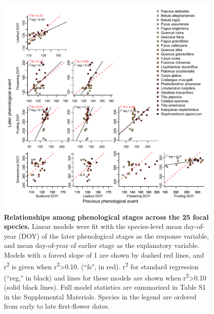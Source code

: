 \documentclass{article}
\begin{document}
 \begin{figure}[h]
 \centering
 \includegraphics{../analyses/figures/Hyp1_forcedslope_samerange.pdf}
 \caption{\textbf{Relationships among phenological stages across the 25 focal species.} Linear models were fit with the species-level mean day-of-year (DOY) of the later phenological stages as the response variable, and mean day-of-year of earlier stage as the explanatory variable. Models with a forced slope of 1 are shown by dashed red lines, and r\textsuperscript{2} is given when r\textsuperscript{2}>0.10. (``fs", in red). r\textsuperscript{2} for standard regression (``reg," in black) and lines for these models are shown when r\textsuperscript{2}>0.10 (solid black lines). Full model statistics are summarized in Table S1 in the Supplemental Materials. Species in the legend are ordered from early to late first-flower dates.} 
 \label{fig:latevearly}
\end{figure}
\end{document}
